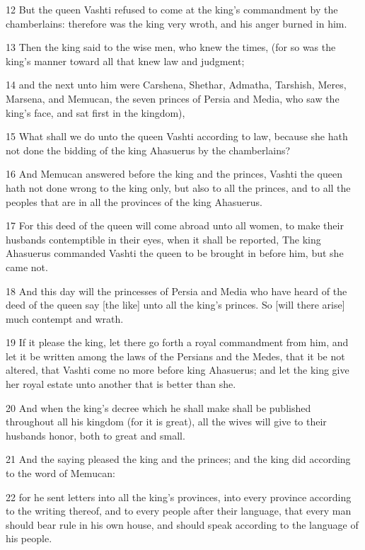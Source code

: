 \par 12 But the queen Vashti refused to come at the king's commandment by the chamberlains: therefore was the king very wroth, and his anger burned in him.
\par 13 Then the king said to the wise men, who knew the times, (for so was the king's manner toward all that knew law and judgment;
\par 14 and the next unto him were Carshena, Shethar, Admatha, Tarshish, Meres, Marsena, and Memucan, the seven princes of Persia and Media, who saw the king's face, and sat first in the kingdom),
\par 15 What shall we do unto the queen Vashti according to law, because she hath not done the bidding of the king Ahasuerus by the chamberlains?
\par 16 And Memucan answered before the king and the princes, Vashti the queen hath not done wrong to the king only, but also to all the princes, and to all the peoples that are in all the provinces of the king Ahasuerus.
\par 17 For this deed of the queen will come abroad unto all women, to make their husbands contemptible in their eyes, when it shall be reported, The king Ahasuerus commanded Vashti the queen to be brought in before him, but she came not.
\par 18 And this day will the princesses of Persia and Media who have heard of the deed of the queen say [the like] unto all the king's princes. So [will there arise] much contempt and wrath.
\par 19 If it please the king, let there go forth a royal commandment from him, and let it be written among the laws of the Persians and the Medes, that it be not altered, that Vashti come no more before king Ahasuerus; and let the king give her royal estate unto another that is better than she.
\par 20 And when the king's decree which he shall make shall be published throughout all his kingdom (for it is great), all the wives will give to their husbands honor, both to great and small.
\par 21 And the saying pleased the king and the princes; and the king did according to the word of Memucan:
\par 22 for he sent letters into all the king's provinces, into every province according to the writing thereof, and to every people after their language, that every man should bear rule in his own house, and should speak according to the language of his people.

